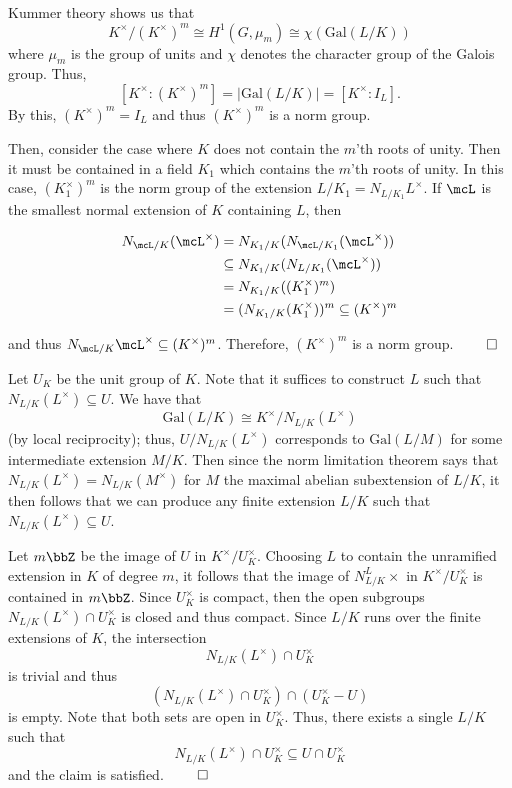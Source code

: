 \documentclass[a4paper, 12pt,oneside,openany]{book}
\begin{document}
Kummer theory shows us that $$K^\times / (K^\times)^m \cong H^1(G, \mu_m) \cong \chi(\text{Gal}(L/K))$$ where $\mu_m$ is the group of units and $\chi$ denotes the character group of the Galois group. Thus, $$[K^\times: (K^\times)^m] = |\text{Gal}(L/K)| = [K^\times:I_L].$$ By this, $(K^\times)^m = I_L$ and thus $(K^\times)^m$ is a norm group.  

Then, consider the case where $K$ does not contain the $m$'th roots of unity. Then it must be contained in a field $K_1$ which contains the $m$'th roots of unity. In this case, $(K_1^\times)^m$ is the norm group of the extension $L/K_1 = N_{L/K_1} L^\times$. If $\mcL$ is the smallest normal extension of $K$ containing $L$, then 

\begin{align*}
	N_{\mcL/K}(\mcL^\times) &= N_{K_1/K}(N_{\mcL/K_1}(\mcL^\times)) \\
	&\subseteq N_{K_1/K}(N_{L/K_1}(\mcL^\times)) \\
	&= N_{K_1/K}((K_1^\times)^m)\\
	&= (N_{K_1/K}(K_1^\times))^m \subseteq (K^\times)^m
\end{align*}

and thus $N_{\mcL/K} \mcL^\times \subseteq (K^\times)^m$. Therefore, $(K^\times)^m$ is a norm group. $\qed$

 Let $U_K$ be the unit group of $K$. Note that it suffices to construct $L$ such that $N_{L/K}(L^\times) \subseteq U$. We have that $$\text{Gal}(L/K) \cong K^\times / N_{L/K} (L^\times)$$ (by local reciprocity); thus, $U/N_{L/K}(L^\times)$ corresponds to $\text{Gal}(L/M)$ for some intermediate extension $M/K$. Then since the norm limitation theorem says that $N_{L/K}(L^\times) = N_{L/K}(M^\times)$ for $M$ the maximal abelian subextension of $L/K$, it then follows that we can produce any finite extension $L/K$ such that $N_{L/K}(L^\times) \subseteq U$.

Let $m\bbZ$ be the image of $U$ in $K^\times / U_K^\times$. Choosing $L$ to contain the unramified extension in $K$ of degree $m$, it follows that the image of $N_{L/K}^L\times$ in $K^\times / U_K^\times$ is contained in $m\bbZ$. Since $U_K^\times$ is compact, then the open subgroups $N_{L/K}(L^\times) \cap U_K^\times$ is closed and thus compact. Since $L/K$ runs over the finite extensions of $K$, the intersection $$N_{L/K}(L^\times) \cap U_K^\times$$ is trivial and thus $$(N_{L/K}(L^\times) \cap U_K^\times) \cap (U_K^\times - U)$$ is empty. Note that both sets are open in $U_K^\times$. Thus, there exists a single $L/K$ such that $$N_{L/K}(L^\times) \cap U_K^\times \subseteq U \cap U_K^\times$$ and the claim is satisfied. $\qed$
\end{document}
